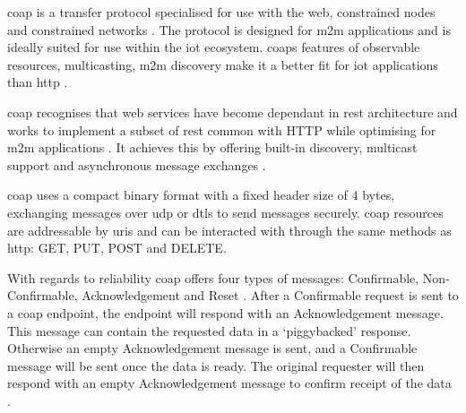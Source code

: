 \acrfull{coap} is a transfer protocol specialised for use with the web, constrained
nodes and constrained networks \citep{shelby_constrained_2014}. The protocol is 
designed for \gls{m2m} applications and is ideally suited for use within the 
\gls{iot} ecosystem. \glspl{coap} features of observable resources, multicasting, \gls{m2m} discovery 
make it a better fit for \gls{iot} applications than \gls{http} \citep{kovatsch_californium:_2014}.

\gls{coap} recognises that web services have become dependant in \gls{rest} 
architecture and works to implement a subset of \gls{rest} common with HTTP while
optimising for \gls{m2m} applications \citep{shelby_constrained_2014}. It achieves 
this by offering built-in discovery, multicast support and asynchronous message 
exchanges \citep{shelby_constrained_2014}. 

\gls{coap} uses a compact binary format with a fixed header size of 4 bytes, 
exchanging messages over \gls{udp} or \gls{dtls} to send messages securely. \gls{coap} 
resources are addressable by \glspl{uri} and can be interacted with through the 
same methods as \gls{http}: GET, PUT, POST and DELETE.

With regards to reliability \gls{coap} offers four types of messages: Confirmable, 
Non-Confirmable, Acknowledgement and Reset \citep{bellavista_towards_2016}.
After a Confirmable request is sent to a \gls{coap} endpoint, the endpoint will 
respond with an Acknowledgement message. This message can contain the requested 
data in a `piggybacked' response. Otherwise an empty Acknowledgement message is sent, 
and a Confirmable message will be sent once the data is ready. The original
requester will then respond with an empty Acknowledgement message to confirm receipt 
of the data \citep{shelby_constrained_2014}.
